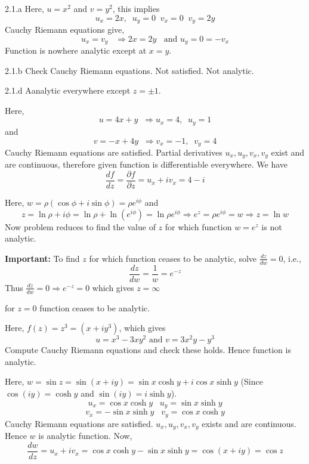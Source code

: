 \begin{Solution}{2.1.a}
        Here, $u=x^2$ and $v=y^2$, this implies
        \[u_x=2x,\;\;u_y=0\;\;v_x= 0\;\;v_y=2y\]
        Cauchy Riemann equations give,
        \[u_x=v_y \;\;\; \Rightarrow 2x=2y \;\;\text{ and } u_y=0=-v_x\]
        Function is nowhere analytic except at $x=y$.
        
\end{Solution}
\begin{Solution}{2.1.b}
        Check Cauchy Riemann equations. Not satisfied. Not analytic.
                
\end{Solution}
\begin{Solution}{2.1.d}
Aanalytic everywhere except $z=\pm 1$.
\end{Solution}
\begin{Solution}{2.2}
Here, \[u=4x + y \;\; \Rightarrow u_x=4,\;\;u_y=1\]
and
\[v=-x + 4y \;\; \Rightarrow v_x=-1,\;\;v_y=4\]
Cauchy Riemann equations are satisfied. Partial derivatives $u_x,u_y,v_x,v_y$ exist and are continuous, therefore given function is differentiable everywhere. We have
\[\frac{df}{dz} = \frac{\partial f}{ \partial z} = u_x+iv_x = 4-i\]
\end{Solution}
\begin{Solution}{2.3}
Here, $w=\rho(\cos \phi + i\sin \phi) = \rho e^{i\phi}$ and
\[z=\ln \rho + i\phi = \ln \rho + \ln (e^{i\phi}) = \ln \rho e^{i\phi}  \Rightarrow e^z = \rho e^{i\phi} = w \Rightarrow z = \ln w \]
Now problem reduces to find the value of $z$ for which function $w=e^z$ is not analytic.

\textbf{Important: } To find $z$ for which function ceases to be analytic, solve $\frac{dz}{dw}=0$, i.e.,
\[\frac{dz}{dw} = \frac{1}{w} = e^{-z} \]
Thus $\frac{dz}{dw} = 0  \Rightarrow  e^{-z} =0$
which gives $z=\infty$
\end{Solution}
\begin{Solution}{2.5}
for $z=0$ function ceases to be analytic.
\end{Solution}
\begin{Solution}{2.8}
Here, $f(z) = z^3 = (x+iy^3)$, which gives
\[u=x^3-3xy^2 \text{ and } v=3x^2y-y^3\]
Compute Cauchy Riemann equations and check these holds. Hence function is analytic.
\end{Solution}
\begin{Solution}{2.9}
Here, $w=\sin z = \sin(x+iy) = \sin x \cosh y + i \cos x \sinh y$ (Since $\cos (iy) = \cosh y$ and $\sin (iy) = i \sinh y$).
\[u_x=\cos x \cosh y\;\;\;u_y=\sin x \sinh y\]
\[v_x= - \sin x \sinh y\;\;\; v_y=\cos x \cosh y\]
Cauchy Riemann equations are satisfied. $u_x,u_y,v_x,v_y$ exists and are continuous. Hence $w$ is analytic  function.
Now,
\[\frac{dw}{dz}=u_x+iv_x =\cos x \cosh y-\sin x \sinh y = \cos (x+iy) = \cos z\]
\end{Solution}
